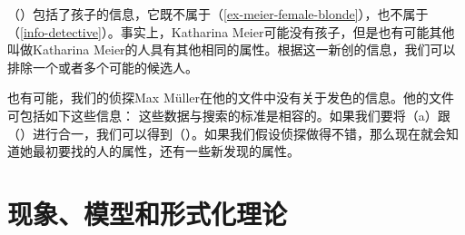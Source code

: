 \ea
{}
\z
（）包括了孩子的信息，它既不属于（\ref{ex-meier-female-blonde}），也不属于（\ref{info-detective}）。事实上，Katharina Meier可能没有孩子，但是也有可能其他叫做Katharina Meier的人具有其他相同的属性。根据这一新创的信息，我们可以排除一个或者多个可能的候选人。

也有可能，我们的侦探Max Müller在他的文件中没有关于发色的信息。他的文件可包括如下这些信息：
\ea
{}
\z
这些数据与搜索的标准是相容的。如果我们要将（a）跟（）进行合一，我们可以得到（）。如果我们假设侦探做得不错，那么现在就会知道她最初要找的人的属性，还有一些新发现的属性。

\section{现象、模型和形式化理论}
\label{sec-modelle-theorien}

